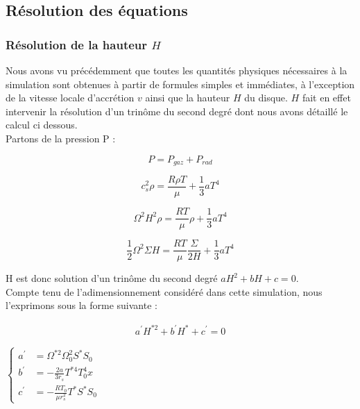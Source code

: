 \subsection{Résolution des équations}

\subsubsection{Résolution de la hauteur $H$ \label{sec::res_H}}
Nous avons vu précédemment que toutes les quantités physiques nécessaires à la simulation sont obtenues à partir de formules simples et immédiates, à l'exception de la vitesse locale d'accrétion $v$ ainsi que la hauteur $H$ du disque.  $H$ fait en effet intervenir la résolution d'un trinôme du second degré dont nous avons détaillé le calcul ci dessous. \\

Partons de la pression P : 

\begin{equation}
	P = P_{gaz} + P_{rad}
\end{equation}


\begin{equation}
	c_{s}^{2} \rho = \frac{R \rho T}{\mu} + \frac{1}{3} a T^{4}
\end{equation}


\begin{equation}
	\Omega^{2} H^{2} \rho = \frac{R T}{\mu} \rho + \frac{1}{3} a T^{4}
\end{equation}


\begin{equation}
	\frac{1}{2} \Omega^{2} \Sigma H = \frac{R T}{\mu} \frac{\Sigma}{2 H} + \frac{1}{3} a T^{4}
	\label{eq:trinôme}
\end{equation}  	   

H est donc solution d'un trinôme du second degré $ a H^{2} + b H + c = 0$. \\
Compte tenu de l'adimensionnement considéré dans cette simulation, nous l'exprimons sous la forme suivante :  

\begin{eqnarray}
  a^{\prime} H^{* 2}+b^{\prime}H^{*}+c^{\prime}=0
  \end{eqnarray}

$\begin{cases}  
      a^{\prime} &= \Omega^{*2} \Omega_{0}^{2} S^{*} S_{0}\\
      b^{\prime} &= - \frac{2 a}{3 r_{s}} T^{*4} T_{0}^{4} x \\
      c^{\prime}&=-\frac{RT_{0}}{\mu r_{s}^{2}} T^{*} S^{*} S_{0}
     \end{cases}$ \\


